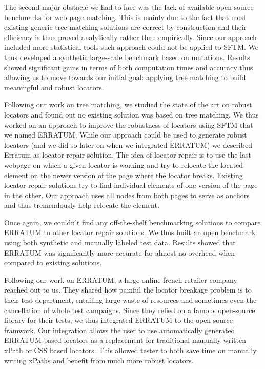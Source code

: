 The second major obstacle we had to face was the lack of available open-source benchmarks for web-page matching. This is mainly due to the fact that most existing generic tree-matching solutions are correct by construction and their efficiency is thus proved analytically rather than empirically.
Since our approach included more statistical tools such approach could not be applied to SFTM.
We thus developed a synthetic large-scale benchmark based on mutations. Results showed significant gains in terms of both computation times and accuracy thus allowing us to move towards our initial goal: applying tree matching to build meaningful and robust locators.

Following our work on tree matching, we studied the state of the art on robust locators and found out no existing solution was based on tree matching. 
We thus worked on an approach to improve the robustness of locators using SFTM that we named ERRATUM.
While our approach could be used to generate robust locators (and we did so later on when we integrated ERRATUM) we described Erratum as locator repair solution.
The idea of locator repair is to use the last webpage on which a given locator is working and try to relocate the located element on the newer version of the page where the locator breaks.
Existing locator repair solutions try to find individual elements of one version of the page in the other.
Our approach uses all nodes from both pages to serve as anchors and thus tremendously help relocate the element.

Once again, we couldn't find any off-the-shelf benchmarking solutions to compare ERRATUM to other locator repair solutions.
We thus built an open benchmark using both synthetic and manually labeled test data. 
Results showed that ERRATUM was significantly more accurate for almost no overhead when compared to existing solutions.

Following our work on ERRATUM, a large online french retailer company reached out to us.
They shared how painful the locator breakage problem is to their test department, entailing large waste of resources and sometimes even the cancellation of whole test campaigns.
Since they relied on a famous open-source library for their tests, we thus integrated ERRATUM to the open source framwork.
Our integration allows the user to use automatically generated ERRATUM-based locators as a replacement for traditional manually written xPath or CSS based locators.
This allowed tester to both save time on manually writing xPaths and benefit from much more robust locators. 

